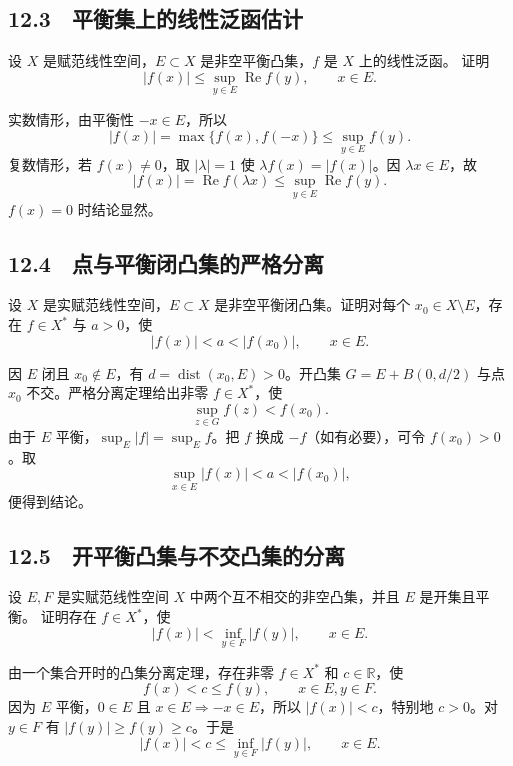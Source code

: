\subsection*{12.3　平衡集上的线性泛函估计}

\begin{problem}
设 $X$ 是赋范线性空间，$E\subset X$ 是非空平衡凸集，$f$ 是 $X$ 上的线性泛函。
证明
\[
 |f(x)|\le\sup_{y\in E}\operatorname{Re}f(y),\qquad x\in E.
\]
\end{problem}

实数情形，由平衡性 $-x\in E$，所以
\[
 |f(x)|=\max\{f(x),f(-x)\}\le\sup_{y\in E}f(y).
\]
复数情形，若 $f(x)\ne0$，取 $|\lambda|=1$ 使
$\lambda f(x)=|f(x)|$。因 $\lambda x\in E$，故
\[
 |f(x)|=\operatorname{Re}f(\lambda x)
 \le\sup_{y\in E}\operatorname{Re}f(y).
\]
$f(x)=0$ 时结论显然。

\subsection*{12.4　点与平衡闭凸集的严格分离}

\begin{problem}
设 $X$ 是实赋范线性空间，$E\subset X$ 是非空平衡闭凸集。证明对每个
$x_0\in X\setminus E$，存在 $f\in X^*$ 与 $a>0$，使
\[
 |f(x)|<a<|f(x_0)|,\qquad x\in E.
\]
\end{problem}

因 $E$ 闭且 $x_0\notin E$，有 $d=\operatorname{dist}(x_0,E)>0$。开凸集
$G=E+B(0,d/2)$ 与点 $x_0$ 不交。严格分离定理给出非零 $f\in X^*$，使
\[
 \sup_{z\in G}f(z)<f(x_0).
\]
由于 $E$ 平衡，$\sup_E|f|=\sup_Ef$。把 $f$ 换成 $-f$（如有必要），可令
$f(x_0)>0$。取
\[
 \sup_{x\in E}|f(x)|<a<|f(x_0)|,
\]
便得到结论。

\subsection*{12.5　开平衡凸集与不交凸集的分离}

\begin{problem}
设 $E,F$ 是实赋范线性空间 $X$ 中两个互不相交的非空凸集，并且 $E$ 是开集且平衡。
证明存在 $f\in X^*$，使
\[
 |f(x)|<\inf_{y\in F}|f(y)|,\qquad x\in E.
\]
\end{problem}

由一个集合开时的凸集分离定理，存在非零 $f\in X^*$ 和 $c\in\mathbb R$，使
\[
 f(x)<c\le f(y),\qquad x\in E, y\in F.
\]
因为 $E$ 平衡，$0\in E$ 且 $x\in E\Rightarrow -x\in E$，所以
$|f(x)|<c$，特别地 $c>0$。对 $y\in F$ 有 $|f(y)|\ge f(y)\ge c$。于是
\[
 |f(x)|<c\le\inf_{y\in F}|f(y)|,\qquad x\in E.
\]

